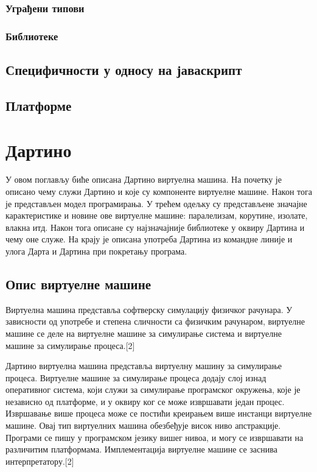 \documentclass[12pt,oneside]{memoir}
\begin{document}
\subsection{Уграђени типови}

\subsection{Библиотеке}

\section{Специфичности у односу на јаваскрипт}

\section{Платформе}


\chapter{Дартино}
\label{chp:dartino}
У овом поглављу биће описана Дартино виртуелна машина. На почетку је описано чему служи Дартино и које су компоненте виртуелне машине. Након тога је представљен модел програмирања. У трећем одељку су представљене значајне карактеристике и новине ове виртуелне машине: паралелизам, корутине, изолате, влакна итд. Након тога описане су најзначајније библиотеке у оквиру Дартина и чему оне служе. На крају је описана употреба Дартина из командне линије и улога Дарта и Дартина при покретању програма.
\section{Опис виртуелне машине}

Виртуелна машина представља софтверску симулацију физичког рачунара. У зависности од употребе и степена сличности са физичким рачунаром, виртуелне машине се деле на виртуелне машине за симулирање система и виртуелне машине за симулирање процеса.[2]%

Дартино виртуелна машина представља виртуелну машину за симулирање процеса. Виртуелне машине за симулирање процеса додају слој изнад оперативног система, који служи за симулирање програмског окружења, које је независно од платформе, и у оквиру ког се може извршавати један процес. Извршавање више процеса може се постићи креирањем више инстанци виртуелне машине. Овај тип виртуелних машина обезбеђује висок ниво апстракције. Програми се пишу у програмском језику вишег нивоа, и могу се извршавати на различитим платформама. Имплементација виртуелне машине се заснива интерпретатору.[2]%
\end{document}
